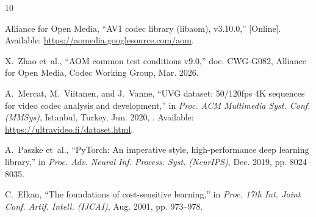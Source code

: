 \documentclass{article}
\begin{document}
\begin{thebibliography}{10}
\vfill\pagebreak

{Alliance for Open Media},
\newblock ``{AV1} codec library ({libaom}), v3.10.0,'' [Online]. Available:
  \url{https://aomedia.googlesource.com/aom}.

X.~Zhao et~al.,
\newblock ``{AOM} common test conditions v9.0,''
\newblock doc. {CWG-G082}, Alliance for Open Media, Codec Working Group, Mar.
  2026.

A.~Mercat, M.~Viitanen, and J.~Vanne,
\newblock ``{UVG} dataset: 50/120fps {4K} sequences for video codec analysis
  and development,''
\newblock in {\em Proc. ACM Multimedia Syst. Conf. ({MMSys})}, Istanbul,
  Turkey, Jun. 2020,
\newblock [Online]. Available: \url{https://ultravideo.fi/dataset.html}.

A.~Paszke et~al.,
\newblock ``{PyTorch}: An imperative style, high-performance deep learning
  library,''
\newblock in {\em Proc. Adv. Neural Inf. Process. Syst. ({NeurIPS})}, Dec.
  2019, pp. 8024--8035.

C.~Elkan,
\newblock ``The foundations of cost-sensitive learning,''
\newblock in {\em Proc. 17th Int. Joint Conf. Artif. Intell. ({IJCAI})}, Aug.
  2001, pp. 973--978.

\end{thebibliography}
\end{document}
